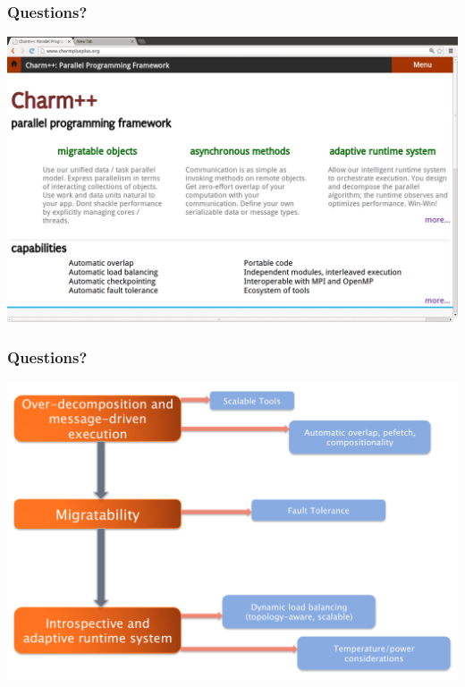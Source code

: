 \begin{frame}
\frametitle{Questions?}
\includegraphics[width=\textwidth]{../figures/charmwebsite-screenshot.png}
\end{frame}


\begin{frame}
\frametitle{Questions?}
\includegraphics[width=\textwidth]{../figures/charmOutline.png}
\end{frame}
